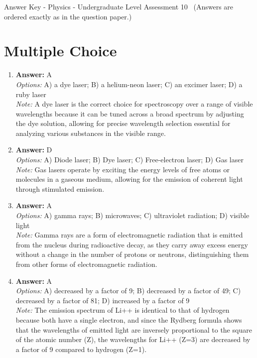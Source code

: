 \documentclass[12pt]{article}
\begin{document}
\begin{center}
Answer Key - Physics - Undergraduate Level Assessment 10 \
\small (Answers are ordered exactly as in the question paper.)
\end{center}

\section*{Multiple Choice}
\begin{enumerate}[label=\arabic*.]
\item \textbf{Answer:} A
\\ \textit{Options:} A) a dye laser; B) a helium-neon laser; C) an excimer laser; D) a ruby laser
\\ \textit{Note:} A dye laser is the correct choice for spectroscopy over a range of visible wavelengths because it can be tuned across a broad spectrum by adjusting the dye solution, allowing for precise wavelength selection essential for analyzing various substances in the visible range.
\item \textbf{Answer:} D
\\ \textit{Options:} A) Diode laser; B) Dye laser; C) Free-electron laser; D) Gas laser
\\ \textit{Note:} Gas lasers operate by exciting the energy levels of free atoms or molecules in a gaseous medium, allowing for the emission of coherent light through stimulated emission.
\item \textbf{Answer:} A
\\ \textit{Options:} A) gamma rays; B) microwaves; C) ultraviolet radiation; D) visible light
\\ \textit{Note:} Gamma rays are a form of electromagnetic radiation that is emitted from the nucleus during radioactive decay, as they carry away excess energy without a change in the number of protons or neutrons, distinguishing them from other forms of electromagnetic radiation.
\item \textbf{Answer:} A
\\ \textit{Options:} A) decreased by a factor of 9; B) decreased by a factor of 49; C) decreased by a factor of 81; D) increased by a factor of 9
\\ \textit{Note:} The emission spectrum of Li++ is identical to that of hydrogen because both have a single electron, and since the Rydberg formula shows that the wavelengths of emitted light are inversely proportional to the square of the atomic number (Z), the wavelengths for Li++ (Z=3) are decreased by a factor of 9 compared to hydrogen (Z=1).

\end{enumerate}
\end{document}
